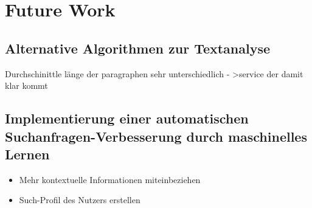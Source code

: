 \section{Future Work}
\label{sec:futureWork}
 \subsection{Alternative Algorithmen zur Textanalyse}
 Durchschinittle länge der paragraphen sehr unterschiedlich - >service der damit klar kommt
 \subsection{Implementierung einer automatischen Suchanfragen-Verbesserung durch maschinelles Lernen}
 	\begin{itemize}
 		\item Mehr kontextuelle Informationen miteinbeziehen
 		\item Such-Profil des Nutzers erstellen

 	\end{itemize}
